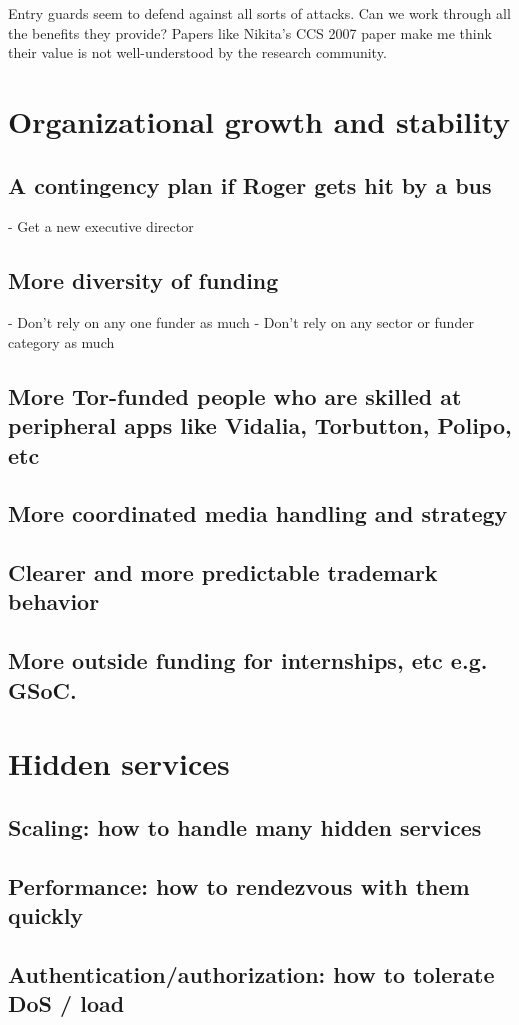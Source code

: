 \documentclass{article}
\begin{document}
Entry guards seem to defend against all sorts of attacks. Can we work
through all the benefits they provide? Papers like Nikita's CCS 2007
paper make me think their value is not well-understood by the research
community.

\section{Organizational growth and stability}
\subsection{A contingency plan if Roger gets hit by a bus}
      - Get a new executive director
\subsection{More diversity of funding}
      - Don't rely on any one funder as much
      - Don't rely on any sector or funder category as much
\subsection{More Tor-funded people who are skilled at peripheral apps like
      Vidalia, Torbutton, Polipo, etc}
\subsection{More coordinated media handling and strategy}
\subsection{Clearer and more predictable trademark behavior}
\subsection{More outside funding for internships, etc e.g. GSoC.}
\section{Hidden services}
\subsection{Scaling: how to handle many hidden services}
\subsection{Performance: how to rendezvous with them quickly}
\subsection{Authentication/authorization: how to tolerate DoS / load}
\end{document}
